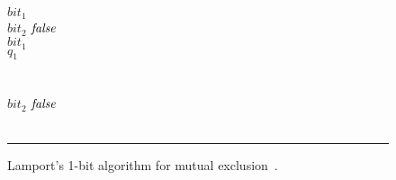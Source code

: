 \begin{figure}[t]
\begin{minipage}[t]{.44\columnwidth}
    \tabTT \algIf $bit_1$ \algThen \\
    \tabTTT $bit_2$ \algAssgn $\operatorname{\mathit{false}}$ \\
    \tabTTT \algWhile $bit_1$ \algDo \algSkip \algOd \\
    \tabTTT \algGoto $q_1$ \\
    \tabTT \algFi \\
    \tabTT {} \\
    \tabTT $bit_2$ \algAssgn $\operatorname{\mathit{false}}$ \\
    \tabT \algOd \\
    \algEnd
  \end{minipage}
  \vspace{1.5ex}
  \hrule
\caption{Lamport's 1-bit algorithm for mutual exclusion~\cite{Lamport86}.}
\label{fig:lamport_src}
\end{figure}

